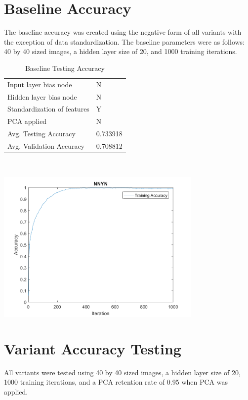 \documentclass[12pt]{article}
\newcommand{\testingValidationAccuracyTable}[7] {
  \begin{tabular}{l|l}
    \hline
    Input layer bias node & #1 \\
    Hidden layer bias node & #2 \\
    Standardization of features & #3 \\
    PCA applied & #4 \\
    \hline
    Avg. Testing Accuracy & #5 \\
    Avg. Validation Accuracy & #6 \\
    \hline
  \end{tabular}
  ~\\[60pt]
  \caption{#7}
}
\begin{document}
\section{Baseline Accuracy}
The baseline accuracy was created using the negative form of all variants with the exception of data standardization. The baseline parameters were as follows: 40 by 40 sized images, a hidden layer size of 20, and 1000 training iterations.
\begin{center}
  \begin{table}[H]
    \begin{varwidth}[b]{0.4\linewidth}
      \centering
      \testingValidationAccuracyTable{N}{N}{Y}{N}{0.733918}{0.708812}{Baseline Testing Accuracy}
      \label{table:baseline}
    \end{varwidth}%
    \hfill
    \begin{minipage}[b]{0.6\linewidth}
      \centering
      \includegraphics[width=100mm]{accuracy_imgs/baseline_training_accuracy.png}
      \label{fig:baseline_img}
    \end{minipage}
  \end{table}
\end{center}

\section{Variant Accuracy Testing}
All variants were tested using 40 by 40 sized images, a hidden layer size of 20, 1000 training iterations, and a PCA retention rate of 0.95 when PCA was applied.
\end{document}
